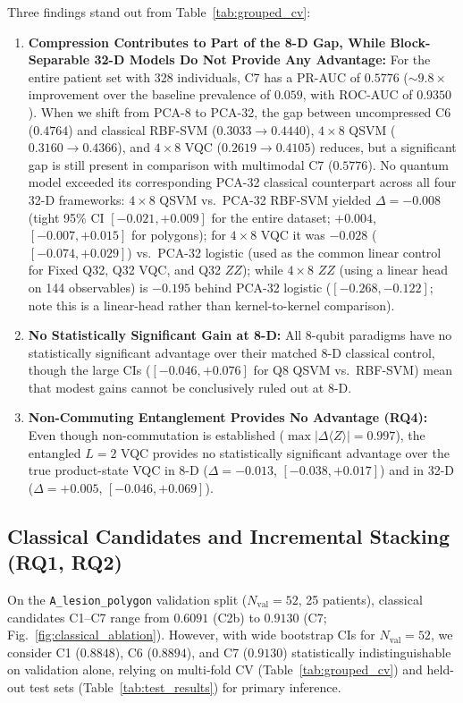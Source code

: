 \documentclass[conference]{IEEEtran}
\begin{document}
Three findings stand out from Table~\ref{tab:grouped_cv}:
\begin{enumerate}
    \item \textbf{Compression Contributes to Part of the 8-D Gap, While Block-Separable 32-D Models Do Not Provide Any Advantage:} For the entire patient set with 328 individuals, C7 has a PR-AUC of $0.5776$ ($\sim 9.8\times$ improvement over the baseline prevalence of $0.059$, with ROC-AUC of $0.9350$). When we shift from PCA-8 to PCA-32, the gap between uncompressed C6 ($0.4764$) and classical RBF-SVM ($0.3033 \to 0.4440$), $4\times 8$ QSVM ($0.3160 \to 0.4366$), and $4\times 8$ VQC ($0.2619 \to 0.4105$) reduces, but a significant gap is still present in comparison with multimodal C7 ($0.5776$). No quantum model exceeded its corresponding PCA-32 classical counterpart across all four 32-D frameworks: $4\times 8$ QSVM vs.\ PCA-32 RBF-SVM yielded $\Delta = -0.008$ (tight 95\% CI $[-0.021, +0.009]$ for the entire dataset; $+0.004$, $[-0.007, +0.015]$ for polygons); for $4\times 8$ VQC it was $-0.028$ ($[-0.074, +0.029]$) vs.\ PCA-32 logistic (used as the common linear control for Fixed Q32, Q32 VQC, and Q32 $ZZ$); while $4\times 8$ $ZZ$ (using a linear head on 144 observables) is $-0.195$ behind PCA-32 logistic ($[-0.268, -0.122]$; note this is a linear-head rather than kernel-to-kernel comparison).
    \item \textbf{No Statistically Significant Gain at 8-D:} All 8-qubit paradigms have no statistically significant advantage over their matched 8-D classical control, though the large CIs ($[-0.046, +0.076]$ for Q8 QSVM vs.\ RBF-SVM) mean that modest gains cannot be conclusively ruled out at 8-D.
    \item \textbf{Non-Commuting Entanglement Provides No Advantage (RQ4):} Even though non-commutation is established ($\max|\Delta\langle Z\rangle| = 0.997$), the entangled $L=2$ VQC provides no statistically significant advantage over the true product-state VQC in 8-D ($\Delta = -0.013$, $[-0.038, +0.017]$) and in 32-D ($\Delta = +0.005$, $[-0.046, +0.069]$).
\end{enumerate}

\subsection{Classical Candidates and Incremental Stacking (RQ1, RQ2)}
On the \texttt{A\_lesion\_polygon} validation split ($N_{\text{val}} = 52$, 25 patients), classical candidates C1--C7 range from $0.6091$ (C2b) to $0.9130$ (C7; Fig.~\ref{fig:classical_ablation}). However, with wide bootstrap CIs for $N_{\text{val}}=52$, we consider C1 ($0.8848$), C6 ($0.8894$), and C7 ($0.9130$) statistically indistinguishable on validation alone, relying on multi-fold CV (Table~\ref{tab:grouped_cv}) and held-out test sets (Table~\ref{tab:test_results}) for primary inference.
\end{document}
